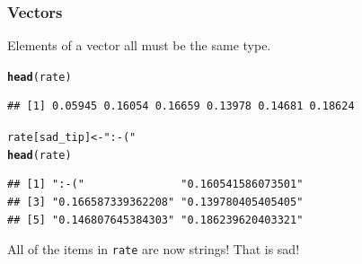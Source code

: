 \documentclass{beamer}\usepackage[]{graphicx}\usepackage[]{color}
\makeatletter
\newcommand{\hlstr}[1]{\textcolor[rgb]{0.192,0.494,0.8}{#1}}%
\newcommand{\hlstd}[1]{\textcolor[rgb]{0.345,0.345,0.345}{#1}}%
\newcommand{\hlkwb}[1]{\textcolor[rgb]{0.69,0.353,0.396}{#1}}%
\newcommand{\hlkwd}[1]{\textcolor[rgb]{0.737,0.353,0.396}{\textbf{#1}}}%
\newenvironment{kframe}{%
 \def\at@end@of@kframe{}%
 \ifinner\ifhmode%
  \def\at@end@of@kframe{\end{minipage}}%
  \begin{minipage}{\columnwidth}%
 \fi\fi%
 \def\FrameCommand##1{\hskip\@totalleftmargin \hskip-\fboxsep
 \colorbox{shadecolor}{##1}\hskip-\fboxsep
     \hskip-\linewidth \hskip-\@totalleftmargin \hskip\columnwidth}%
 \MakeFramed {\advance\hsize-\width
   \@totalleftmargin\z@ \linewidth\hsize
   \@setminipage}}%
 {\par\unskip\endMakeFramed%
 \at@end@of@kframe}
\newenvironment{knitrout}{}{} %
\makeatother
\begin{document}
\small
\begin{frame}[fragile]
    \frametitle{Vectors}
Elements of a vector all must be the same type.

\begin{knitrout}\footnotesize
{}\color{fgcolor}\begin{kframe}
\begin{alltt}
\hlkwd{head}\hlstd{(rate)}
\end{alltt}
\begin{verbatim}
## [1] 0.05945 0.16054 0.16659 0.13978 0.14681 0.18624
\end{verbatim}
\begin{alltt}
\hlstd{rate[sad_tip]} \hlkwb{<-} \hlstr{":-("}
\hlkwd{head}\hlstd{(rate)}
\end{alltt}
\begin{verbatim}
## [1] ":-("               "0.160541586073501"
## [3] "0.166587339362208" "0.139780405405405"
## [5] "0.146807645384303" "0.186239620403321"
\end{verbatim}
\end{kframe}
\end{knitrout}


All of the items in \texttt{rate} are now strings! That is sad!
\end{frame}
\normalsize
\end{document}
